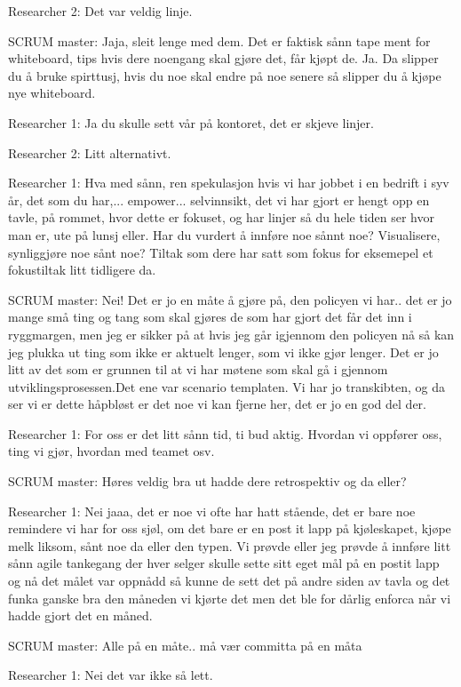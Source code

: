 Researcher 2: Det var veldig linje.

SCRUM master: Jaja, sleit lenge med dem. Det er faktisk sånn tape ment for whiteboard, tips hvis dere noengang skal gjøre det, får kjøpt de. Ja. Da slipper du å bruke spirttusj, hvis du noe skal endre på noe senere så slipper du å kjøpe nye whiteboard. 

Researcher 1: Ja du skulle sett vår på kontoret, det er skjeve linjer.

Researcher 2: Litt alternativt.

Researcher 1: Hva med sånn, ren spekulasjon hvis vi har jobbet i en bedrift i syv år, det som du har,... empower... selvinnsikt, det vi har gjort er hengt opp en tavle, på rommet, hvor dette er fokuset, og har linjer så du hele tiden ser hvor man er, ute på lunsj eller. Har du vurdert å innføre noe sånnt noe? Visualisere, synliggjøre noe sånt noe? Tiltak som dere har satt som fokus for eksemepel et fokustiltak litt tidligere da.

SCRUM master: Nei! Det er jo en måte å gjøre på, den policyen vi har.. det er jo mange små ting og tang som skal gjøres de som har gjort det får det inn i ryggmargen, men jeg er sikker på at hvis jeg går igjennom den policyen nå så kan jeg plukka ut ting som ikke er aktuelt lenger, som vi ikke gjør lenger. Det er jo litt av det som er grunnen til at vi har møtene som skal gå i gjennom utviklingsprosessen.Det ene var scenario templaten. Vi har jo transkibten, og da ser vi er dette håpbløst er det noe vi kan fjerne her, det er jo en god del der. 

Researcher 1: For oss er det litt sånn tid, ti bud aktig. Hvordan vi oppfører oss, ting vi gjør, hvordan med teamet osv.

SCRUM master: Høres veldig bra ut hadde dere retrospektiv og da eller?

Researcher 1: Nei jaaa, det er noe vi ofte har hatt stående, det er bare noe remindere vi har for oss sjøl, om det bare er en post it lapp på kjøleskapet, kjøpe melk liksom, sånt noe da eller den typen. Vi prøvde eller jeg prøvde å innføre litt sånn agile tankegang der hver selger skulle sette sitt eget mål på en postit lapp og nå det målet var oppnådd så kunne de sett det på andre siden av tavla og det funka ganske bra den måneden vi kjørte det men det ble for dårlig enforca når vi hadde gjort det en måned.

SCRUM master: Alle på en måte.. må vær committa på en måta

Researcher 1: Nei det var ikke så lett.

